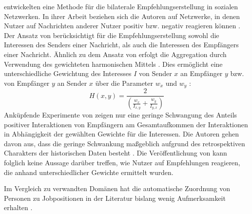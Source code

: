 \textcite[S. 247ff.]{kim:2:inproceedings} entwickelten eine Methode für die bilaterale Empfehlungserstellung in sozialen Netzwerken.
In ihrer Arbeit beziehen sich die Autoren auf Netzwerke, in denen Nutzer auf Nachrichten anderer Nutzer positiv bzw. negativ reagieren können \cite[S. 548]{koprinska:inbook} .
Der Ansatz von \textcite[S. 247ff.]{kim:2:inproceedings} berücksichtigt für die Empfehlungserstellung sowohl die Interessen des Senders einer Nachricht, als auch die Interessen des Empfängers einer Nachricht.
Ähnlich zu dem Ansatz von \textcite[S. 207ff.]{pizzato:2010} erfolgt die Aggregation durch Verwendung des gewichteten harmonischen Mittels \cite[S. 251]{kim:2:inproceedings}.
Dies ermöglicht eine unterschiedliche Gewichtung des Interesses $I$ von Sender $x$ an Empfänger $y$ bzw. von Empfänger $y$ an Sender $x$ über die Parameter $w_{x}$ und $w_{y}$ \cite[S. 251]{kim:2:inproceedings}:
\begin{equation}\label{eq34}
    H(x,y) = \frac{2}{(\frac{w_{x}}{I_{x,y}}+\frac{w_{y}}{I_{y,x}})}
\end{equation}
Anküpfende Experimente von \textcite[S. 259]{kim:2:inproceedings} zeigen nur eine geringe Schwangung des Anteils positiver Interaktionen von Empfängern am Gesamtaufkommen der Interaktionen in Abhängigkeit der gewählten Gewichte für die Interessen.
Die Autoren gehen davon aus, dass die geringe Schwankung maßgeblich aufgrund des retrospektiven Charakters der historischen Daten besteht \cite[S. 259]{kim:2:inproceedings}.
Die Veröffentlichung von \textcite[S. 259]{kim:2:inproceedings} kann folglich keine Aussage darüber treffen, wie Nutzer auf Empfehlungen reagieren, die anhand unterschiedlicher Gewichte ermittelt wurden.

Im Vergleich zu verwandten Domänen hat die automatische Zuordnung von Personen zu Jobpositionen in der Literatur bislang wenig Aufmerksamkeit erhalten \cite[S. 1469]{yildirim:article}.

